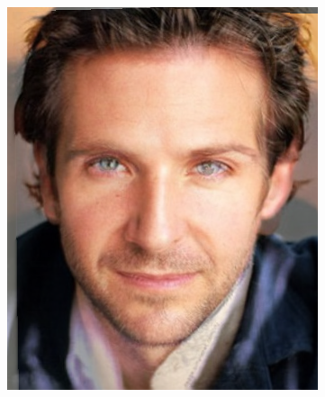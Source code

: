 \documentclass[conference]{IEEEtran}
\begin{document}
\begin{figure}[H]
\begin{multicols}{3}
    \includegraphics[width=1.0\linewidth]{results/faces/XL/img30.png} \par
    

\end{multicols}
\end{figure}
\end{document}
